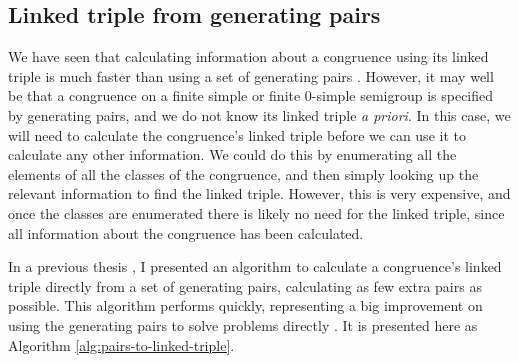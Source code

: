 \subsection{Linked triple from generating pairs}
\label{sec:pairs-to-linked-triple}

We have seen that calculating information about a congruence using its linked
triple is much faster than using a set of generating pairs \cite[\S
6.1]{mtorpey_pre_msc}.  However, it may well be that a congruence on a finite
simple or finite 0-simple semigroup is specified by generating pairs, and we do
not know its linked triple \textit{a priori}.  In this case, we will need to
calculate the congruence's linked triple before we can use it to calculate any
other information.  We could do this by enumerating all the elements of all the
classes of the congruence, and then simply looking up the relevant information
to find the linked triple.  However, this is very expensive, and once the
classes are enumerated there is likely no need for the linked triple, since all
information about the congruence has been calculated.

In a previous thesis \cite[\S 3.2]{mtorpey_msc}, I presented an algorithm to
calculate a congruence's linked triple directly from a set of generating pairs,
calculating as few extra pairs as possible.  This algorithm performs quickly,
representing a big improvement on using the generating pairs to solve problems
directly \cite[\S 6.1.2]{mtorpey_msc}.  It is presented here as Algorithm
\ref{alg:pairs-to-linked-triple}.

